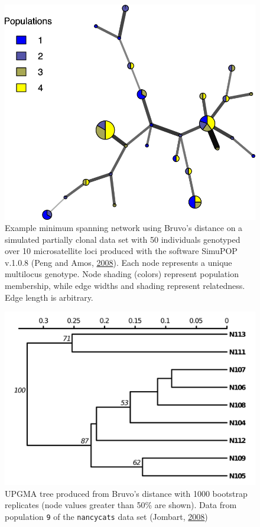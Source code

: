 \documentclass[double,12pt]{beavtex}
\begin{document}
  \begin{figure}
  
  {\centering \includegraphics[width=0.8\linewidth]{figure/poppr/bruvo_color} 
  
  }
  
  \caption[Example minimum spanning network using Bruvo's distance on a simulated
  partially clonal data set with 50 individuals genotyped over 10 microsatellite
  loci.]{Example minimum spanning network using Bruvo's distance on a simulated
  partially clonal data set with 50 individuals genotyped over 10
  microsatellite loci produced with the software SimuPOP v.1.0.8 (Peng and
  Amos, \protect\hyperlink{ref-peng2008forward}{2008}). Each node
  represents a unique multilocus genotype. Node shading (colors) represent
  population membership, while edge widths and shading represent
  relatedness. Edge length is arbitrary.}\label{fig:poppr3}
  \end{figure}
  
  \newpage
  
  \begin{figure}
  
  {\centering \includegraphics[width=0.8\linewidth]{figure/poppr/nancy9-boot-redo} 
  
  }
  
  \caption[UPGMA tree produced from Bruvo's distance with 1000 bootstrap
  replicates.]{UPGMA tree produced from Bruvo's distance with 1000 bootstrap replicates
  (node values greater than 50\% are shown). Data from population
  \texttt{9} of the \texttt{nancycats} data set (Jombart,
  \protect\hyperlink{ref-Jombart_2008}{2008})}\label{fig:poppr4}
  \end{figure}
  
\end{document}
